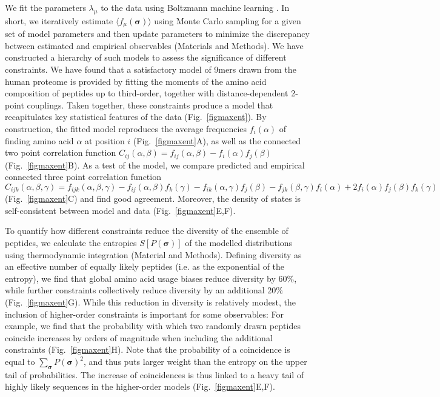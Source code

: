 \documentclass[superscriptaddress,twocolumn,pre]{revtex4}
\newcommand{\B}{\boldsymbol}
\newcommand{\<}{\langle}
\renewcommand{\>}{\rangle}
\begin{document}
We fit the parameters $\lambda_\mu$ to the data using Boltzmann machine learning \cite{Ackley1985}. In short, we iteratively estimate $\langle f_\mu(\B \sigma)\rangle$ using Monte Carlo sampling for a given set of model parameters and then update parameters to minimize the discrepancy between estimated and empirical observables (Materials and Methods).
We have constructed a hierarchy of such models to assess the significance of different constraints. We have found that a satisfactory model of 9mers drawn from the human proteome is provided by fitting the moments of the amino acid composition of peptides up to third-order, together with distance-dependent 2-point couplings. Taken together, these constraints produce a model that recapitulates key statistical features of the data (Fig.~\ref{figmaxent}). By construction, the fitted model reproduces the average frequencies $f_i(\alpha)$ of finding amino acid $\alpha$ at position $i$ (Fig.~\ref{figmaxent}A), as well as the connected two point correlation function $C_{ij}(\alpha, \beta) = f_{ij}(\alpha, \beta) - f_i(\alpha) f_j(\beta)$ (Fig.~\ref{figmaxent}B). As a test of the model, we compare predicted and empirical connected three point correlation function $C_{ijk}(\alpha, \beta, \gamma) = f_{ijk}(\alpha, \beta, \gamma) - f_{ij}(\alpha, \beta) f_k(\gamma) - f_{ik}(\alpha, \gamma) f_j(\beta) - f_{jk}(\beta, \gamma) f_i(\alpha) + 2 f_i(\alpha) f_j(\beta) f_k(\gamma)$ (Fig.~\ref{figmaxent}C) and find good agreement. Moreover, the density of states is self-consistent between model and data (Fig.~\ref{figmaxent}E,F).

To quantify how different constraints reduce the diversity of the ensemble of peptides, we calculate the entropies $S[P(\B \sigma)]$ of the modelled distributions using thermodynamic integration (Material and Methods). Defining diversity as an effective number of equally likely peptides (i.e. as the exponential of the entropy), we find that global amino acid usage biases reduce diversity by 60\%, while further constraints collectively reduce diversity by an additional 20\% (Fig.~\ref{figmaxent}G). While this reduction in diversity is relatively modest, the inclusion of higher-order constraints is important for some observables: For example, we find that the probability with which two randomly drawn peptides coincide increases by orders of magnitude when including the additional constraints (Fig.~\ref{figmaxent}H). Note that the probability of a coincidence is equal to $\sum_{\B \sigma} P(\B \sigma)^2$, and thus puts larger weight than the entropy on the upper tail of probabilities. The increase of coincidences is thus linked to a heavy tail of highly likely sequences in the higher-order models (Fig.~\ref{figmaxent}E,F).
\end{document}
